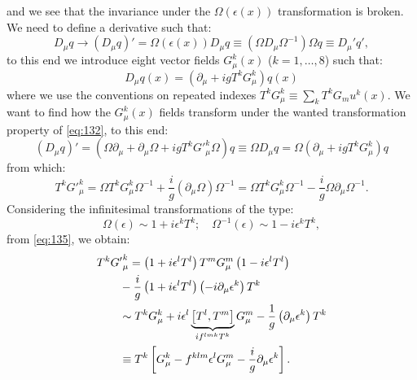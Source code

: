 and we see that the invariance under the $\Omega(\epsilon(x))$ transformation is
broken. We need to define a derivative such that:
\begin{equation}
  \label{eq:132}
  D_\mu q \rightarrow \left( D_\mu q \right)' = \Omega(\epsilon(x)) D_\mu q
  \equiv \left( \Omega D_\mu \Omega^{-1} \right) \Omega q \equiv D_\mu' q',
\end{equation}
to this end we introduce eight vector fields $G_\mu^k(x)$ ($k = 1, \dots, 8$)
such that:
\begin{equation}
  \label{eq:133}
  D_\mu q(x) = \left( \partial_\mu + i g T^k G_\mu^k \right) q(x)
\end{equation}
where we use the conventions on repeated indexes $T^k G_\mu^k \equiv \sum_k T^k
G_mu^k(x)$. We want to find how the $G_\mu^k(x)$ fields transform under the
wanted transformation property of \cref{eq:132}, to this end:
\begin{equation}
  \label{eq:134}
  \left( D_\mu q \right)' = \left( \Omega \partial_\mu + \partial_\mu \Omega + i
    g T^k {G'}_\mu^k \Omega \right) q \equiv \Omega D_\mu q = \Omega
  \left( \partial_\mu + i g T^k G_\mu^k \right)q
\end{equation}
from which:
\begin{equation}
  \label{eq:135}
  T^k {G'}_\mu^k = \Omega T^k G_\mu^k \Omega^{-1} + \frac{i}{g}
  \left( \partial_\mu \Omega \right) \Omega^{-1} = \Omega T^k G_\mu^k
  \Omega^{-1} - \frac{i}{g} \Omega \partial_\mu \Omega^{-1}.
\end{equation}
Considering the infinitesimal transformations of the type:
\begin{equation}
  \label{eq:136}
  \Omega(\epsilon) \sim 1 + i \epsilon^k T^k; \quad \Omega^{-1}(\epsilon) \sim 1 -
  i \epsilon^k T^k,
\end{equation}
from \cref{eq:135}, we obtain:
\begin{equation}
  \label{eq:137}
  \begin{aligned}
    \MoveEqLeft T^k {G'}_\mu^k = \left( 1 + i \epsilon^l T^l \right) T^m
    G_\mu^m \left( 1 - i \epsilon^l T^l \right) \\
    & - \frac{i}{g} \left( 1 + i \epsilon^l T^l \right)\left( -i \partial_\mu
      \epsilon^k \right) T^k \\
    & \sim T^k G_\mu^k + i \epsilon^l \underbrace{\left[ T^l, T^m
      \right]}_{if^{lmk} T^k} G_\mu^m - \frac{1}{g}\left( \partial_\mu
      \epsilon^k \right) T^k \\
    & \equiv T^k \left[ G_\mu^k - f^{klm} \epsilon^l G_\mu^m -
      \frac{i}{g} \partial_\mu \epsilon^k \right].
   \end{aligned}
\end{equation}
